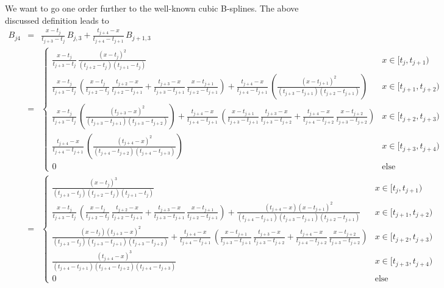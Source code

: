 \documentclass[12pt]{report}
\begin{document}
We want to go one order further to the well-known cubic B-splines. The
above discussed definition leads to
\begin{eqnarray*}
  B_{j4} &=& \frac{x-t_j}{t_{j+3}-t_j}\,B_{j,3}
  +\frac{t_{j+4}-x}{t_{j+4}-t_{j+1}}\,B_{j+1,3}\\
  &=&
  \begin{cases}
    \frac{x-t_j}{t_{j+3}-t_j}\,\frac{(x-t_j)^2}{(t_{j+2}-t_j)(t_{j+1}-t_j)}
    & x\in[t_j,t_{j+1})\\
    \frac{x-t_j}{t_{j+3}-t_j}\,\left(
      \frac{x-t_j}{t_{j+2}-t_j}\,\frac{t_{j+2}-x}{t_{j+2}-t_{j+1}}
      +\frac{t_{j+3}-x}{t_{j+3}-t_{j+1}}\,\frac{x-t_{j+1}}{t_{j+2}-t_{j+1}}
    \right)
    +\frac{t_{j+4}-x}{t_{j+4}-t_{j+1}}\,\left(
      \frac{(x-t_{j+1})^2}{(t_{j+3}-t_{j+1})(t_{j+2}-t_{j+1})}
    \right) & x\in[t_{j+1},t_{j+2})\\
    \frac{x-t_j}{t_{j+3}-t_j}\,\left(
      \frac{(t_{j+3}-x)^2}{(t_{j+3}-t_{j+1})(t_{j+3}-t_{j+2})}
    \right)
    +\frac{t_{j+4}-x}{t_{j+4}-t_{j+1}}\,\left(
      \frac{x-t_{j+1}}{t_{j+3}-t_{j+1}}\,\frac{t_{j+3}-x}{t_{j+3}-t_{j+2}}
      +\frac{t_{j+4}-x}{t_{j+4}-t_{j+2}}\,\frac{x-t_{j+2}}{t_{j+3}-t_{j+2}}
  \right)
    & x\in[t_{j+2},t_{j+3})\\
    \frac{t_{j+4}-x}{t_{j+4}-t_{j+1}}\,\left(
      \frac{(t_{j+4}-x)^2}{(t_{j+4}-t_{j+2})(t_{j+4}-t_{j+3})}
    \right) & x\in[t_{j+3},t_{j+4})\\
    0 & \mbox{else}
  \end{cases}\\
  &=&
  \begin{cases}
    \frac{(x-t_j)^3}{(t_{j+3}-t_j)(t_{j+2}-t_j)(t_{j+1}-t_j)}
    & x\in[t_j,t_{j+1})\\
    \frac{x-t_j}{t_{j+3}-t_j}\,\left(
      \frac{x-t_j}{t_{j+2}-t_j}\,\frac{t_{j+2}-x}{t_{j+2}-t_{j+1}}
      +\frac{t_{j+3}-x}{t_{j+3}-t_{j+1}}\,\frac{x-t_{j+1}}{t_{j+2}-t_{j+1}}
    \right)
    +\frac{(t_{j+4}-x)(x-t_{j+1})^2}{(t_{j+4}-t_{j+1})(t_{j+3}-t_{j+1})(t_{j+2}-t_{j+1})}
     & x\in[t_{j+1},t_{j+2})\\
    \frac{(x-t_j)(t_{j+3}-x)^2}{(t_{j+3}-t_j)(t_{j+3}-t_{j+1})(t_{j+3}-t_{j+2})}
    +\frac{t_{j+4}-x}{t_{j+4}-t_{j+1}}\,\left(
      \frac{x-t_{j+1}}{t_{j+3}-t_{j+1}}\,\frac{t_{j+3}-x}{t_{j+3}-t_{j+2}}
      +\frac{t_{j+4}-x}{t_{j+4}-t_{j+2}}\,\frac{x-t_{j+2}}{t_{j+3}-t_{j+2}}
  \right)
    & x\in[t_{j+2},t_{j+3})\\
    \frac{(t_{j+4}-x)^3}{(t_{j+4}-t_{j+1})(t_{j+4}-t_{j+2})(t_{j+4}-t_{j+3})}
    & x\in[t_{j+3},t_{j+4})\\
    0 & \mbox{else}
  \end{cases}
\end{eqnarray*}
\end{document}
